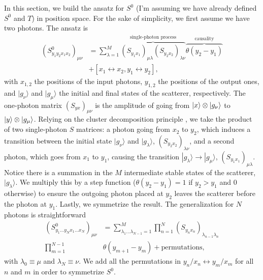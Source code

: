 \documentclass[notitlepage, prx, preprint, amsmath,superscriptaddress,amssymb]{revtex4-1}
\begin{document}
In this section, we build the ansatz for $S^0$ {\color{blue}(I'm assuming we have already defined $S^0$ and $T$)} in position space. For the sake of simplicity, we first assume we have two photons. The ansatz is
\begin{align}\label{eq:S0_2}
(S^0_{y_1y_2x_1x_2})_{\mu\nu}& = \sum_{\lambda=1}^M \overbrace{(S_{y_1x_1})_{\mu\lambda}(S_{y_2x_2})_{\lambda\nu}}^{\text{single-photon process}}\overbrace{\theta(y_2-y_1)}^\text{causality} \nonumber\\
&+ [x_1\leftrightarrow x_2,y_1\leftrightarrow y_2],
\end{align}
with $x_{1,2}$ the positions of the input photons, $y_{1,2}$ the positions of the output ones, and $|g_\nu\rangle$ and $|g_\mu\rangle$ the initial and final states of the scatterer, respectively. The one-photon matrix $(S_{yx})_{\mu\nu}$ is the amplitude of going from $\ket{x}\otimes \ket{g_\nu}$ to $\ket{y}\otimes \ket{g_\mu}$. Relying on the cluster decomposition principle \cite{weinberg1995}, we take the product of two single-photon $S$ matrices: a photon going from $x_2$ to $y_2$, which induces a transition between  the initial state $|g_\nu\rangle$ and $|g_\lambda\rangle$, $(S_{y_2x_2})_{\lambda\nu}$, and a second photon, which goes from $x_1$ to $y_1$, causing the transition $|g_\lambda\rangle\to |g_\mu\rangle$, $(S_{y_1x_1})_{\mu\lambda}$. Notice there is a summation in the $M$ intermediate stable states of the scatterer, $|g_\lambda\rangle$. We multiply this by a step function ($\theta(y_2-y_1)=1$ if $y_2>y_1$ and $0$ otherwise) to ensure the outgoing photon placed at $y_2$ leaves the scatterer before the photon at $y_1$. Lastly, we symmetrize the result. The generalization for $N$ photons is straightforward
\begin{align}\label{eq:S0_N}
(S^0_{y_1\dots y_N x_1\dots x_N})_{\mu\nu}& = \sum_{\lambda_1\dots \lambda_{N-1}=1}^M\prod_{n=1}^N (S_{y_nx_n})_{\lambda_{n-1}\lambda_n}\nonumber\\
\prod_{m=1}^{N-1}&\theta(y_{m+1}-y_m) + \text{permutations},
\end{align}
with $\lambda_0\equiv \mu$ and $\lambda_N\equiv\nu$. We add all the permutations in $y_n/x_n\leftrightarrow y_m/x_m$ for all $n$ and $m$ in order to symmetrize $S^0$.
\end{document}
